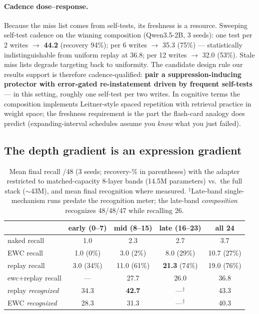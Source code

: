 \documentclass[11pt]{article}
\newcommand{\qwen}{Qwen3.5-2B}
\begin{document}
\paragraph{Cadence dose--response.} Because the miss list comes from self-tests, its freshness is a
resource. Sweeping self-test cadence on the winning composition (\qwen{}, 3 seeds): one test per 2
writes $\to$ \textbf{44.2} (recovery 94\%); per 6 writes $\to$ 35.3 (75\%) --- statistically
indistinguishable from uniform replay at 36.8; per 12 writes $\to$ 32.0 (53\%). Stale miss lists
degrade targeting back to uniformity. The candidate design rule our results support is therefore
cadence-qualified: \textbf{pair a suppression-inducing protector with error-gated re-instatement
driven by frequent self-tests} --- in this setting, roughly one self-test per two writes. In cognitive
terms the composition implements Leitner-style spaced repetition with retrieval practice
\citep{roediger2006} in weight space; the freshness requirement is the part the flash-card analogy
does predict (expanding-interval schedules assume you \emph{know} what you just failed).

\subsection{The depth gradient is an expression gradient}\label{sec:layers}

\begin{table}[t]
\centering\small
\begin{tabular}{lcccc}
\toprule
& early (0--7) & mid (8--15) & late (16--23) & all 24 \\
\midrule
naked recall  & 1.0 & 2.3 & 2.7 & 3.7 \\
EWC recall    & 1.0 \hfill (0\%) & 3.0 \hfill (2\%) & 8.0 \hfill (29\%) & 10.7 \hfill (27\%) \\
replay recall & 3.0 \hfill (34\%) & 11.0 \hfill (61\%) & \textbf{21.3} \hfill (74\%) & 19.0 \hfill (76\%) \\
ewc+replay recall & --- & 27.7 & 26.0 & 36.8 \\
\midrule
replay \emph{recognized} & 34.3 & \textbf{42.7} & ---$^\ddagger$ & 43.3 \\
EWC \emph{recognized} & 28.3 & 31.3 & ---$^\ddagger$ & 40.3 \\
\bottomrule
\end{tabular}
\caption{Mean final recall /48 (3 seeds; recovery-\% in parentheses) with the adapter restricted to
matched-capacity 8-layer bands (14.5M parameters) vs.\ the full stack ($\sim$43M), and mean final
recognition where measured. $^\ddagger$Late-band single-mechanism runs predate the recognition meter;
the late-band \emph{composition} recognizes 48/48/47 while recalling 26.}
\label{tab:layers}
\end{table}
\end{document}
